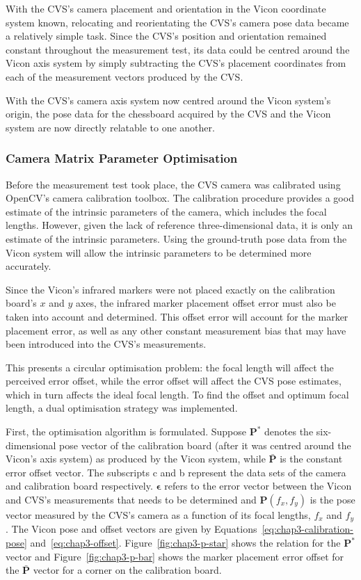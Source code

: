 With the CVS's camera placement and orientation in the Vicon coordinate system known, relocating and reorientating the CVS's camera pose data became a relatively simple task. Since the CVS's position and orientation remained constant throughout the measurement test, its data could be centred around the Vicon axis system by simply subtracting the CVS's placement coordinates from each of the measurement vectors produced by the CVS.

With the CVS's camera axis system now centred around the Vicon system's origin, the pose data for the chessboard acquired by the CVS and the Vicon system are now directly relatable to one another.  

\subsubsection{Camera Matrix Parameter Optimisation}
\label{sec:focal-optimisation}

Before the measurement test took place, the CVS camera was calibrated using OpenCV's camera calibration toolbox. The calibration procedure provides a good estimate of the intrinsic parameters of the camera, which includes the focal lengths. However, given the lack of reference three-dimensional data, it is only an estimate of the intrinsic parameters. Using the ground-truth pose data from the Vicon system will allow the intrinsic parameters to be determined more accurately. 

Since the Vicon's infrared markers were not placed exactly on the calibration board's $x$ and $y$ axes, the infrared marker placement offset error must also be taken into account and determined. This offset error will account for the marker placement error, as well as any other constant measurement bias that may have been introduced into the CVS's measurements. 

This presents a circular optimisation problem: the focal length will affect the perceived error offset, while the error offset will affect the CVS pose estimates, which in turn affects the ideal focal length. To find the offset and optimum focal length, a dual optimisation strategy was implemented.  

First, the optimisation algorithm is formulated. Suppose $\bm{P}^*$ denotes the six-dimensional pose vector of the calibration board (after it was centred around the Vicon's axis system) as produced by the Vicon system, while $\bar{\bm{P}}$ is the constant error offset vector. The subscripts c and b represent the data sets of the camera and calibration board respectively. $\bm{\epsilon}$ refers to the error vector between the Vicon and CVS's measurements that needs to be determined and $\bm{P}(f_x, f_y)$ is the pose vector measured by the CVS's camera as a function of its focal lengths, $f_x$ and $f_y$. The Vicon pose and offset vectors are given by Equations~\ref{eq:chap3-calibration-pose} and~\ref{eq:chap3-offset}. Figure~\ref{fig:chap3-p-star} shows the relation for the $\bm{P}^*$ vector and Figure~\ref{fig:chap3-p-bar} shows the marker placement error offset for the $\bar{\bm{P}}$ vector for a corner on the calibration board. 

